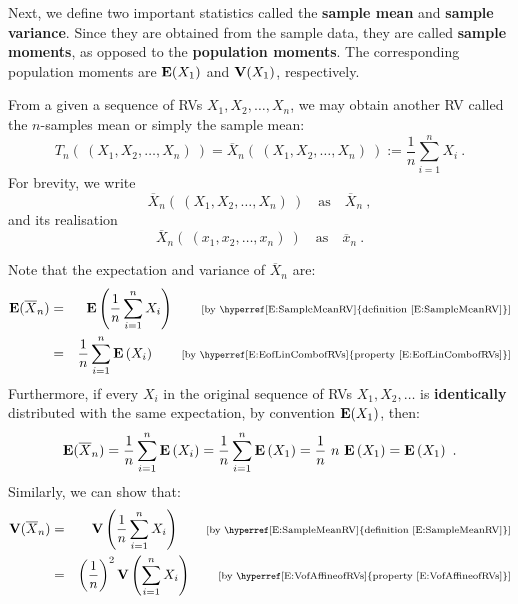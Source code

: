 Next, we define two important statistics called the {\bf sample mean} and {\bf sample variance}.  Since they are obtained from the sample data, they are called {\bf sample moments}, as opposed to the {\bf population moments}.  The corresponding population moments are $\mathbf{E}(X_1)$ and $\mathbf{V}(X_1)$, respectively.
\begin{definition}\label{D:SampleMean}
From a given a sequence of RVs $X_1,X_2,\ldots,X_n$, we may obtain another RV called the $n$-samples mean or simply the sample mean:
\begin{equation}\label{E:SampleMeanRV}
T_n( \ (X_1,X_2,\ldots,X_n) \ ) = \overline{X}_n( \ (X_1,X_2,\ldots,X_n) \ ) := \frac{1}{n} \sum_{i=1}^n X_i  \ .
\end{equation}
For brevity, we write $$\overline{X}_n( \ (X_1,X_2,\ldots,X_n) \ ) \quad \text{as} \quad \overline{X}_n \ ,$$ and its realisation $$\overline{X}_n( \ (x_1,x_2,\ldots,x_n) \ ) \quad \text{as} \quad \overline{x}_n \ .$$
\end{definition}
Note that the expectation and variance of $\overline{X}_n$ are:
\begin{eqnarray}
\e(\overline{X}_n) &=& \e \left(  \frac{1}{n} \sum_{i=1}^n X_i \right) \qquad \text{{\scriptsize[by \hyperref[E:SampleMeanRV]{definition \eqref{E:SampleMeanRV}}]}} \notag \\
&=&  \frac{1}{n} \sum_{i=1}^n \e \left( X_i \right) \qquad \text{{\scriptsize [by \hyperref[E:EofLinCombofRVs]{property \eqref{E:EofLinCombofRVs}}]}} \notag
\end{eqnarray}
Furthermore, if every $X_i$ in the original sequence of RVs $X_1,X_2,\ldots$ is {\bf identically} distributed with the same expectation, by convention $\mathbf{E}(X_1)$, then:
\begin{equation}\label{E:ExpOfSampleMeanOfIDSeq}
\e(\overline{X}_n) 
= \frac{1}{n} \sum_{i=1}^n \e \left( X_i \right)
=  \frac{1}{n} \sum_{i=1}^n \e \left( X_1 \right) 
=  \frac{1}{n} \ n \ \e \left( X_1 \right)  = \e \left( X_1 \right) \ .
\end{equation}
Similarly, we can show that:
\begin{eqnarray}
\V(\overline{X}_n) &=& \V \left(  \frac{1}{n} \sum_{i=1}^n X_i \right) \qquad \text{{\scriptsize[by \hyperref[E:SampleMeanRV]{definition \eqref{E:SampleMeanRV}}]}} \notag \\
&=& \left( \frac{1}{n} \right)^2  \V \left( \sum_{i=1}^n X_i \right) \qquad \text{{\scriptsize [by \hyperref[E:VofAffineofRVs]{property \eqref{E:VofAffineofRVs}}]}} \notag
\end{eqnarray}
